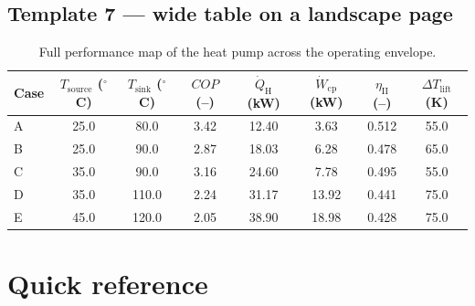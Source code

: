 \documentclass[11pt,a4paper]{article}
\begin{document}
%
\begin{landscape}
\section*{Template 7 --- wide table on a landscape page}

\begin{table}[!htb]
  \centering
  \caption{Full performance map of the heat pump across the operating
           envelope.}
  \label{tab:wide}
  \begin{tabular}{l
                  S[table-format=2.1] S[table-format=3.1]
                  S[table-format=1.2] S[table-format=2.2]
                  S[table-format=2.2] S[table-format=1.3]
                  S[table-format=3.1]}
    \toprule
    Case & {$T_\mathrm{source}$ ($^{\circ}$C)}
         & {$T_\mathrm{sink}$ ($^{\circ}$C)}
         & {$COP$ (--)}
         & {$\dot{Q}_\mathrm{H}$ (kW)}
         & {$\dot{W}_\mathrm{cp}$ (kW)}
         & {$\eta_\mathrm{II}$ (--)}
         & {$\Delta T_\mathrm{lift}$ (K)} \\
    \midrule
    A & 25.0 & 80.0 & 3.42 & 12.40 &  3.63 & 0.512 &  55.0 \\
    B & 25.0 & 90.0 & 2.87 & 18.03 &  6.28 & 0.478 &  65.0 \\
    C & 35.0 & 90.0 & 3.16 & 24.60 &  7.78 & 0.495 &  55.0 \\
    D & 35.0 & 110.0 & 2.24 & 31.17 & 13.92 & 0.441 &  75.0 \\
    E & 45.0 & 120.0 & 2.05 & 38.90 & 18.98 & 0.428 &  75.0 \\
    \bottomrule
  \end{tabular}
\end{table}
\end{landscape}

\clearpage
\section*{Quick reference}
\end{document}
